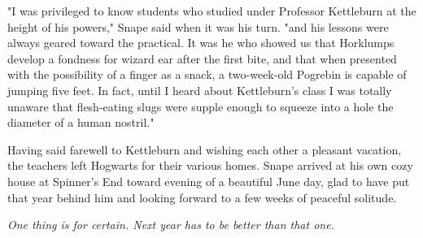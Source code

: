 "I was privileged to know students who studied under Professor Kettleburn at the height of his powers," Snape said when it was his turn. "and his lessons were always geared toward the practical. It was he who showed us that Horklumps develop a fondness for wizard ear after the first bite, and that when presented with the possibility of a finger as a snack, a two-week-old Pogrebin is capable of jumping five feet. In fact, until I heard about Kettleburn's class I was totally unaware that flesh-eating slugs were supple enough to squeeze into a hole the diameter of a human nostril."

Having said farewell to Kettleburn and wishing each other a pleasant vacation, the teachers left Hogwarts for their various homes. Snape arrived at his own cozy house at Spinner's End toward evening of a beautiful June day, glad to have put that year behind him and looking forward to a few weeks of peaceful solitude.

\emph{One thing is for certain. Next year has to be better than that one.}


